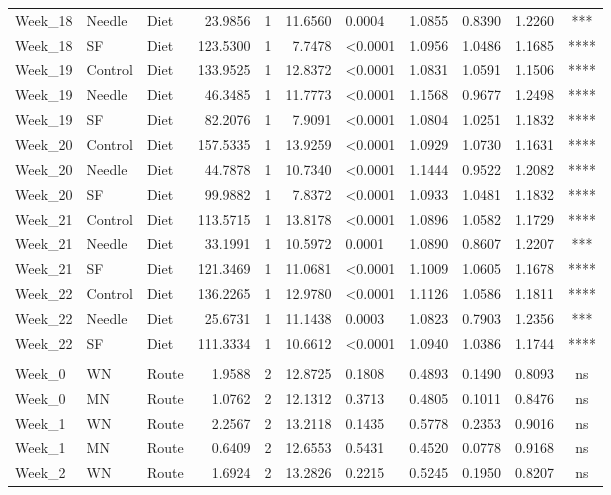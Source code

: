 \documentclass[
  12pt,
  letterpaper,
]{article}
\begin{document}
\begin{longtable}{lllrrrlrrrc}
Week\_18 & Needle & Diet & 23.9856 & 1 & 11.6560 & 0.0004 & 1.0855 & 0.8390 & 1.2260 & *** \\ 
Week\_18 & SF & Diet & 123.5300 & 1 & 7.7478 & <0.0001 & 1.0956 & 1.0486 & 1.1685 & **** \\ 
Week\_19 & Control & Diet & 133.9525 & 1 & 12.8372 & <0.0001 & 1.0831 & 1.0591 & 1.1506 & **** \\ 
Week\_19 & Needle & Diet & 46.3485 & 1 & 11.7773 & <0.0001 & 1.1568 & 0.9677 & 1.2498 & **** \\ 
Week\_19 & SF & Diet & 82.2076 & 1 & 7.9091 & <0.0001 & 1.0804 & 1.0251 & 1.1832 & **** \\ 
Week\_20 & Control & Diet & 157.5335 & 1 & 13.9259 & <0.0001 & 1.0929 & 1.0730 & 1.1631 & **** \\ 
Week\_20 & Needle & Diet & 44.7878 & 1 & 10.7340 & <0.0001 & 1.1444 & 0.9522 & 1.2082 & **** \\ 
Week\_20 & SF & Diet & 99.9882 & 1 & 7.8372 & <0.0001 & 1.0933 & 1.0481 & 1.1832 & **** \\ 
Week\_21 & Control & Diet & 113.5715 & 1 & 13.8178 & <0.0001 & 1.0896 & 1.0582 & 1.1729 & **** \\ 
Week\_21 & Needle & Diet & 33.1991 & 1 & 10.5972 & 0.0001 & 1.0890 & 0.8607 & 1.2207 & *** \\ 
Week\_21 & SF & Diet & 121.3469 & 1 & 11.0681 & <0.0001 & 1.1009 & 1.0605 & 1.1678 & **** \\ 
Week\_22 & Control & Diet & 136.2265 & 1 & 12.9780 & <0.0001 & 1.1126 & 1.0586 & 1.1811 & **** \\ 
Week\_22 & Needle & Diet & 25.6731 & 1 & 11.1438 & 0.0003 & 1.0823 & 0.7903 & 1.2356 & *** \\ 
Week\_22 & SF & Diet & 111.3334 & 1 & 10.6612 & <0.0001 & 1.0940 & 1.0386 & 1.1744 & **** \\ 
\midrule\addlinespace[2.5pt]
\multicolumn{11}{l}{Split by Diet} \\[2.5pt] 
\midrule\addlinespace[2.5pt]
Week\_0 & WN & Route & 1.9588 & 2 & 12.8725 & 0.1808 & 0.4893 & 0.1490 & 0.8093 & ns \\ 
Week\_0 & MN & Route & 1.0762 & 2 & 12.1312 & 0.3713 & 0.4805 & 0.1011 & 0.8476 & ns \\ 
Week\_1 & WN & Route & 2.2567 & 2 & 13.2118 & 0.1435 & 0.5778 & 0.2353 & 0.9016 & ns \\ 
Week\_1 & MN & Route & 0.6409 & 2 & 12.6553 & 0.5431 & 0.4520 & 0.0778 & 0.9168 & ns \\ 
Week\_2 & WN & Route & 1.6924 & 2 & 13.2826 & 0.2215 & 0.5245 & 0.1950 & 0.8207 & ns \\ 

\end{longtable}
\end{document}
